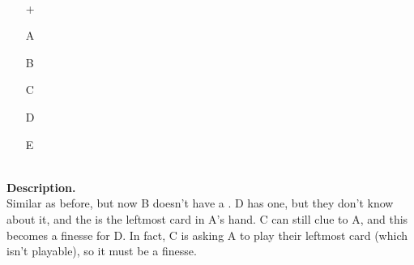 \begin{example}	\hfill \\
	\begin{minipage}{0.45\textwidth}
		\begin{itemize}
			\item[\Large +]      
			\item[\Large A]    
			\item[\Large B]    
			\item[\Large C]    
			\item[\Large D]    
			\item[\Large E]    
		\end{itemize}
	\end{minipage}%
	\begin{minipage}{0.55\textwidth}
		\hfill \\
		
		\textbf{Description.} \\
		
		Similar as before, but now B doesn't have a . D has one, but they don't know about it, and the  is the leftmost card in A's hand. C can still clue  to A, and this becomes a finesse for D. In fact, C is asking A to play their leftmost card (which isn't playable), so it must be a finesse.
	\end{minipage}
\end{example} \vspace{0.15 cm}

